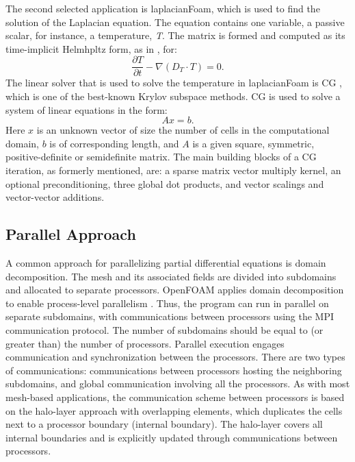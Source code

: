 \documentclass[3p,times]{elsarticle}
\begin{document}
The second selected application is laplacianFoam, which is used to find the solution of the Laplacian equation. The equation contains one variable, a passive scalar, for instance, a temperature, \emph{T}. The matrix is formed and computed as its time-implicit Helmhpltz form, as in \cite{openfoam}, for:
\begin{equation}\label{eighth}
\frac{\partial T}{\partial t} - \nabla (D_{T}\cdot T) = 0 .
\end{equation}
The linear solver that is used to solve the temperature in laplacianFoam is CG \cite{saad_book}, which is one of the best-known Krylov subspace methods. CG is used to solve a system of linear equations in the form:
\begin{equation}\label{nine}
Ax = b .
\end{equation}
Here \emph{$x$} is an unknown vector of size the number of cells in the computational domain, \emph{$b$} is of corresponding length, and \emph{$A$} is a given square, symmetric, positive-definite or semidefinite matrix. The main building blocks of a CG iteration, as formerly mentioned, are: a sparse matrix vector multiply kernel, an optional preconditioning,  three global dot products, and vector scalings and vector-vector additions. 


\subsection{Parallel Approach} 
A common approach for parallelizing partial differential equations is domain decomposition. The mesh and its associated fields are divided into subdomains and allocated to separate processors. OpenFOAM applies domain decomposition to enable process-level parallelism \cite{openfoam}. Thus, the program can run in parallel on separate subdomains, with communications between processors using the MPI communication protocol. The number of subdomains should be equal to (or greater than) the number of processors. Parallel execution engages communication and synchronization between the processors. There are two types of communications: communications between processors hosting the neighboring subdomains, and global communication involving all the processors. As with most mesh-based applications, the communication scheme between processors is based on the halo-layer approach with overlapping elements, which duplicates the cells next to a processor boundary (internal boundary). The halo-layer covers all internal boundaries and is explicitly updated through communications between processors. \\
\end{document}
